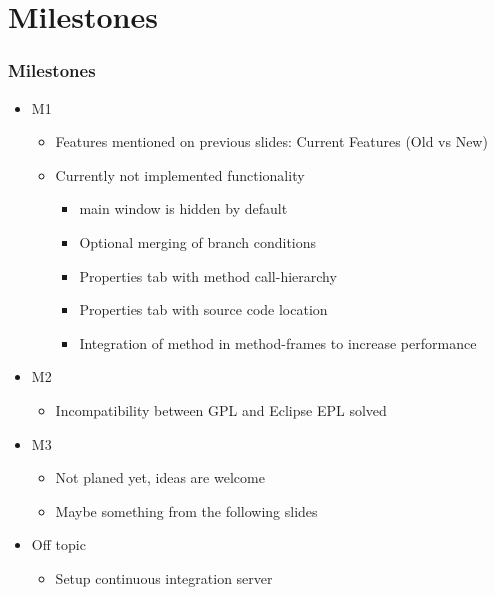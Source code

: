 \documentclass[accentcolor=tud9d,colorbacktitle,inverttitle,landscape,english,presentation,t]{tudbeamer}
\begin{document}
\section{Milestones}
   \begin{frame}[t]
		\frametitle{Milestones}
      
      \begin{itemize}
         \item M1
               \begin{itemize}
                  \item Features mentioned on previous slides: Current Features (Old vs New)
                  \item Currently not implemented functionality
                        \begin{itemize}
                           \item \KeY main window is hidden by default
                           \item Optional merging of branch conditions
                           \item Properties tab with method call-hierarchy
                           \item Properties tab with source code location
                           \item Integration of method in method-frames to increase performance
                        \end{itemize}
               \end{itemize}         
         \item M2
               \begin{itemize}
                  \item Incompatibility between \KeY GPL and Eclipse EPL solved
               \end{itemize}         
         \item M3
               \begin{itemize}
                  \item Not planed yet, ideas are welcome
                  \item Maybe something from the following slides
               \end{itemize}
         \item Off topic
               \begin{itemize}
                  \item Setup continuous integration server
               \end{itemize}         
      \end{itemize}
	\end{frame}
   
\end{document}
